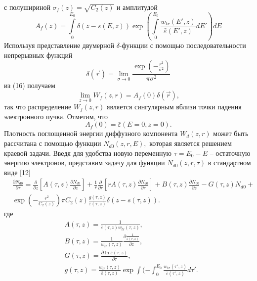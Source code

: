 с полушириной $\sigma_f(z)=\sqrt{C_2 (z)}$ и амплитудой
\begin{equation}
A_f(z) = \int\limits_0^{E_0}\delta( z − s(E, z))\exp\left(\int\limits_0^{E_0}\frac{w_{tr} ( E′, z)}{\bar{\varepsilon}(E′, z)}dE′\right) dE
\end{equation}
Используя представление двумерной \(\delta\)-функции с помощью последовательности непрерывных функций \cite{korn}
\begin{equation}
\delta(\vec{r}) = \lim_{\sigma\rightarrow0} \frac{\exp\left(−\frac{r^2}{\sigma^2}\right)}{\pi\sigma^2}
\end{equation}
из (16) получаем
\begin{equation}
\lim_{z\rightarrow0} W_f(z, r) = A_f(0)\delta(\vec{r}),
\end{equation}
так что распределение \( W_f(z, r) \) является сингулярным вблизи точки падения
электронного пучка. Отметим, что
\begin{equation}
    A_f(0) = \bar{\varepsilon}(E=0, z=0).    
\end{equation}
Плотность поглощенной энергии диффузного компонента \(W_d(z, r)\) может быть
рассчитана с помощью функции \(N_{d0}(z, r, E),\) которая является решением краевой задачи.
Введя для удобства новую переменную \(\tau=E_0-E\) -- остаточную энергию электронов,
представим задачу для функции \(N_{d0}(z, r, \tau)\) в стандартном виде [12]
\begin{align}
& \frac{\partial N_{d0}}{\partial\tau} = \frac{\partial}{\partial z}\left[A (\tau , z )\frac{\partial N_{d0}}{\partial z}\right]
+ \frac{1}{r}\frac{\partial}{\partial r}\left[rA(\tau, z)
\frac{\partial N_{d0}}{\partial r}\right] + B (\tau , z )
\frac{\partial N_{d0}}{\partial z} − G (\tau , z )N_{d0}
+ \\
& \exp\left( −\frac{r^2}{C_2(z)}\right)\pi C_2(z)\frac{g(\tau, z)}{\bar{\varepsilon} (\tau , z ) }\delta ( z − s(\tau , z )).
\nonumber
\end{align}
где
\begin{align}
& A (\tau, z) = \frac{1}{\bar{\varepsilon}(\tau, z)w_{tr} (\tau, z)}, \\
& B (\tau, z) = \frac{1}{w_{tr}(\tau, z)}\frac{\partial\frac{1}{\bar{\varepsilon}(\tau, z)}}{\partial z}, \\
& G (\tau, z) = \frac{\partial\ln\bar{\varepsilon}(\tau, z )}{\partial\tau},\\
& g(\tau, z) = \frac{w_{tr}(\tau , z )}{\bar{\varepsilon} (\tau , z )}\exp\int( −\int_0^{E_0} \frac{w_{tr}(\tau′, z )}{\bar{\varepsilon} (\tau′, z)}d\tau′.    
\end{align}
